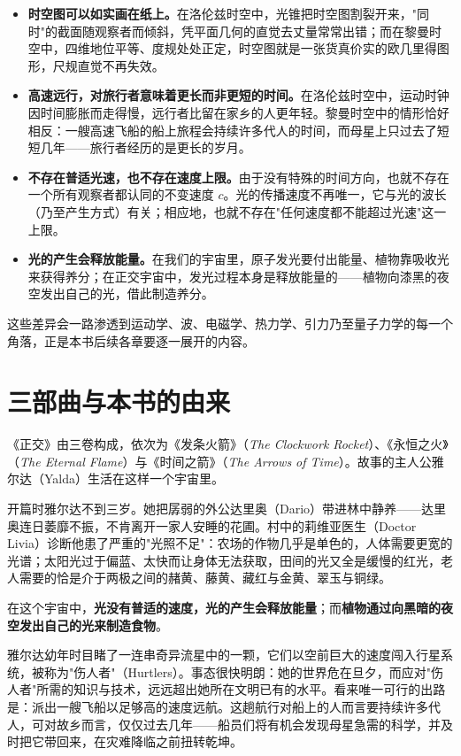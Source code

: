 \begin{itemize}
  \item \textbf{时空图可以如实画在纸上。}在洛伦兹时空中，光锥把时空图割裂开来，"同时"的截面随观察者而倾斜，凭平面几何的直觉去丈量常常出错；而在黎曼时空中，四维地位平等、度规处处正定，时空图就是一张货真价实的欧几里得图形，尺规直觉不再失效。
  \item \textbf{高速远行，对旅行者意味着更长而非更短的时间。}在洛伦兹时空中，运动时钟因时间膨胀而走得慢，远行者比留在家乡的人更年轻。黎曼时空中的情形恰好相反：一艘高速飞船的船上旅程会持续许多代人的时间，而母星上只过去了短短几年——旅行者经历的是更长的岁月。
  \item \textbf{不存在普适光速，也不存在速度上限。}由于没有特殊的时间方向，也就不存在一个所有观察者都认同的不变速度 $c$。光的传播速度不再唯一，它与光的波长（乃至产生方式）有关；相应地，也就不存在"任何速度都不能超过光速"这一上限。
  \item \textbf{光的产生会释放能量。}在我们的宇宙里，原子发光要付出能量、植物靠吸收光来获得养分；在正交宇宙中，发光过程本身是释放能量的——植物向漆黑的夜空发出自己的光，借此制造养分。
\end{itemize}


这些差异会一路渗透到运动学、波、电磁学、热力学、引力乃至量子力学的每一个角落，正是本书后续各章要逐一展开的内容。

\section{三部曲与本书的由来}

《正交》由三卷构成，依次为《发条火箭》（\emph{The Clockwork Rocket}）、《永恒之火》（\emph{The Eternal Flame}）与《时间之箭》（\emph{The Arrows of Time}）。故事的主人公雅尔达（Yalda）生活在这样一个宇宙里。

开篇时雅尔达不到三岁。她把孱弱的外公达里奥（Dario）带进林中静养——达里奥连日萎靡不振，不肯离开一家人安睡的花圃。村中的莉维亚医生（Doctor Livia）诊断他患了严重的"光照不足"：农场的作物几乎是单色的，人体需要更宽的光谱；太阳光过于偏蓝、太快而让身体无法获取，田间的光又全是缓慢的红光，老人需要的恰是介于两极之间的赭黄、藤黄、藏红与金黄、翠玉与铜绿。

在这个宇宙中，\textbf{光没有普适的速度，光的产生会释放能量}；而\textbf{植物通过向黑暗的夜空发出自己的光来制造食物}。

雅尔达幼年时目睹了一连串奇异流星中的一颗，它们以空前巨大的速度闯入行星系统，被称为"伤人者"（Hurtlers）。事态很快明朗：她的世界危在旦夕，而应对"伤人者"所需的知识与技术，远远超出她所在文明已有的水平。看来唯一可行的出路是：派出一艘飞船以足够高的速度远航。这趟航行对船上的人而言要持续许多代人，可对故乡而言，仅仅过去几年——船员们将有机会发现母星急需的科学，并及时把它带回来，在灾难降临之前扭转乾坤。


